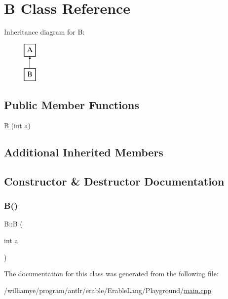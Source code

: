 \hypertarget{class_b}{}\section{B Class Reference}
\label{class_b}
Inheritance diagram for B\+:\begin{figure}[H]
\begin{center}
\leavevmode
\includegraphics[height=2.000000cm]{class_b}
\end{center}
\end{figure}
\subsection*{Public Member Functions}
\begin{DoxyCompactItemize}
\item 
\mbox{\hyperlink{class_b_a649478177af5ec5962deac6fbbc6510b}{B}} (int \mbox{\hyperlink{class_a_a49a53415abd8f1b26235579cc805a15f}{a}})
\end{DoxyCompactItemize}
\subsection*{Additional Inherited Members}


\subsection{Constructor \& Destructor Documentation}
\mbox{\label{class_b_a649478177af5ec5962deac6fbbc6510b}} 
\subsubsection{\texorpdfstring{B()}{B()}}
{\footnotesize\ttfamily B\+::B (\begin{DoxyParamCaption}\item[{int}]{a }\end{DoxyParamCaption})\hspace{0.3cm}{\ttfamily [inline]}}



The documentation for this class was generated from the following file\+:\begin{DoxyCompactItemize}
\item 
/williamye/program/antlr/erable/\+Erable\+Lang/\+Playground/\mbox{\hyperlink{_playground_2main_8cpp}{main.\+cpp}}\end{DoxyCompactItemize}
